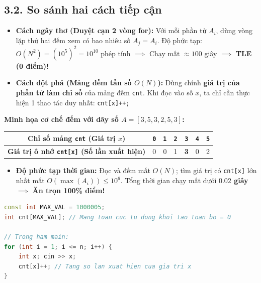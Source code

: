 \documentclass[11pt,a4paper]{article}
\begin{document}
\subsection*{\color{AsianBlue}\small 3.2. So sánh hai cách tiếp cận}
\begin{itemize}
    \setlength{\itemsep}{1.5pt}
    \footnotesize
    \item \textbf{Cách ngây thơ (Duyệt cạn 2 vòng for):} Với mỗi phần tử $A_i$, dùng vòng lặp thứ hai đếm xem có bao nhiêu số $A_j = A_i$. Độ phức tạp: $O(N^2) = (10^5)^2 = 10^{10}$ phép tính $\implies$ Chạy mất $\approx 100$ giây $\implies$ \textbf{TLE (0 điểm)!}
    \item \textbf{Cách đột phá (Mảng đếm tần số $O(N)$):} Dùng chính \textbf{giá trị của phần tử làm chỉ số} của mảng đếm \texttt{cnt}. Khi đọc vào số $x$, ta chỉ cần thực hiện 1 thao tác duy nhất: \texttt{cnt[x]++;}
\end{itemize}

\begin{center}
\footnotesize
\textbf{Minh họa cơ chế đếm với dãy số $A = [3, 5, 3, 2, 5, 3]$:}
\vspace{0.1cm}

\begin{tabular}{|c|c|c|c|c|c|c|}
\hline
\textbf{Chỉ số mảng \texttt{cnt} (Giá trị $x$)} & \texttt{0} & \texttt{1} & \texttt{2} & \texttt{3} & \texttt{4} & \texttt{5} \\
\hline
\textbf{Giá trị ô nhớ \texttt{cnt[x]} (Số lần xuất hiện)} & 0 & 0 & 1 & \textbf{3} & 0 & 2 \\
\hline
\end{tabular}
\end{center}

\vspace{-0.15cm}
\begin{itemize}
    \setlength{\itemsep}{1.5pt}
    \footnotesize
    \item \textbf{Độ phức tạp thời gian:} Đọc và đếm mất $O(N)$; tìm giá trị có \texttt{cnt[x]} lớn nhất mất $O(\max(A_i)) \le 10^6$. Tổng thời gian chạy mất dưới \textbf{$0.02$ giây} $\implies$ \textbf{Ăn trọn 100\% điểm!}
\end{itemize}

\begin{lstlisting}[language=C++]
const int MAX_VAL = 1000005;
int cnt[MAX_VAL]; // Mang toan cuc tu dong khoi tao toan bo = 0

// Trong ham main:
for (int i = 1; i <= n; i++) {
    int x; cin >> x;
    cnt[x]++; // Tang so lan xuat hien cua gia tri x
}
\end{lstlisting}
\end{document}
